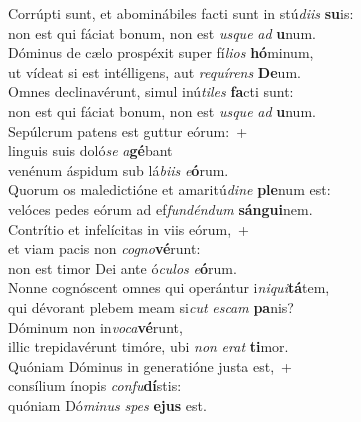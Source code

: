 \evenverse Corrúpti sunt, et abominábiles facti sunt in stú\textit{di}\textit{is} \textbf{su}is:~\*\\
\evenverse non est qui fáciat bonum, non est \textit{us}\textit{que} \textit{ad} \textbf{u}num.\\
\oddverse Dóminus de cælo prospéxit super fí\textit{li}\textit{os} \textbf{hó}minum,~\*\\
\oddverse ut vídeat si est intélligens, aut \textit{re}\textit{quí}\textit{rens} \textbf{De}um.\\
\evenverse Omnes declinavérunt, simul inú\textit{ti}\textit{les} \textbf{fa}cti sunt:~\*\\
\evenverse non est qui fáciat bonum, non est \textit{us}\textit{que} \textit{ad} \textbf{u}num.\\
\oddverse Sepúlcrum patens est guttur eórum:~+\\
\oddverse  linguis suis doló\textit{se} \textit{a}\textbf{gé}bant~\*\\
\oddverse venénum áspidum sub lá\textit{bi}\textit{is} \textit{e}\textbf{ó}rum.\\
\evenverse Quorum os maledictióne et amaritú\textit{di}\textit{ne} \textbf{ple}num est:~\*\\
\evenverse velóces pedes eórum ad ef\textit{fun}\textit{dén}\textit{dum} \textbf{sán}\textbf{gui}nem.\\
\oddverse Contrítio et infelícitas in viis eórum,~+\\
\oddverse  et viam pacis non \textit{co}\textit{gno}\textbf{vé}runt:~\*\\
\oddverse non est timor Dei ante ó\textit{cu}\textit{los} \textit{e}\textbf{ó}rum.\\
\evenverse Nonne cognóscent omnes qui operántur i\textit{ni}\textit{qui}\textbf{tá}tem,~\*\\
\evenverse qui dévorant plebem meam si\textit{cut} \textit{e}\textit{scam} \textbf{pa}nis?\\
\oddverse Dóminum non in\textit{vo}\textit{ca}\textbf{vé}runt,~\*\\
\oddverse illic trepidavérunt timóre, ubi \textit{non} \textit{e}\textit{rat} \textbf{ti}mor.\\
\evenverse Quóniam Dóminus in generatióne justa est,~+\\
\evenverse  consílium ínopis \textit{con}\textit{fu}\textbf{dí}stis:~\*\\
\evenverse quóniam Dó\textit{mi}\textit{nus} \textit{spes} \textbf{e}\textbf{jus} est.\\
